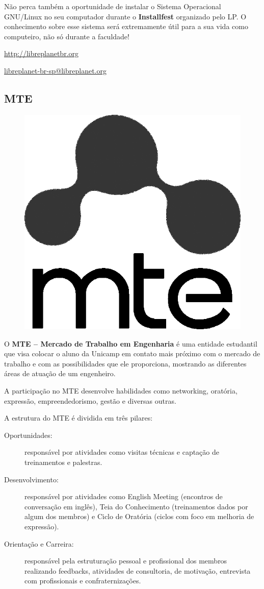 Não perca também a oportunidade de instalar o Sistema Operacional
GNU/Linux no seu computador durante o {\bf Installfest} organizado pelo
LP.  O conhecimento sobre esse sistema será extremamente útil para a sua
vida como computeiro, não só durante a faculdade!

\begin{compactitemize}
    \item  \url{http://libreplanetbr.org}
    \item  \url{libreplanet-br-sp@libreplanet.org}
\end{compactitemize}

\subsection{MTE}

\begin{figure}[h!]
    \centering
    \includegraphics[width=.35\textwidth]{img/alem_da_graduacao/mte_logo.png}
\end{figure}

O \textbf{MTE -- Mercado de Trabalho em Engenharia} é uma entidade estudantil
que visa colocar o aluno da Unicamp em contato mais próximo com o mercado de
trabalho e com as possibilidades que ele proporciona, mostrando as diferentes
áreas de atuação de um engenheiro.

A participação no MTE desenvolve habilidades como networking, oratória,
expressão, empreendedorismo, gestão e diversas outras.

A estrutura do MTE é dividida em três pilares:

\begin{description}
    \item[Oportunidades:] responsável por atividades como visitas técnicas e
        captação de treinamentos e palestras.

    \item[Desenvolvimento:] responsável por atividades como English Meeting
        (encontros de conversação em inglês), Teia do Conhecimento (treinamentos
        dados por algum dos membros) e Ciclo de Oratória (ciclos com foco em
        melhoria de expressão).

    \item[Orientação e Carreira:] responsável pela estruturação pessoal e
        profissional dos membros realizando feedbacks, atividades de
        consultoria, de motivação, entrevista com profissionais e
        confraternizações.
\end{description}

